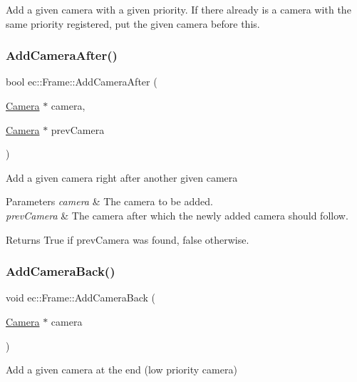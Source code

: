 Add a given camera with a given priority. If there already is a camera with the same priority registered, put the given camera before this. \mbox{\label{classec_1_1_frame_aa7cccffd1e0919e75faa35d1f38da5c1}} 
\subsubsection{\texorpdfstring{Add\+Camera\+After()}{AddCameraAfter()}}
{\footnotesize\ttfamily bool ec\+::\+Frame\+::\+Add\+Camera\+After (\begin{DoxyParamCaption}\item[{\mbox{\hyperlink{classec_1_1_camera}{Camera}} $\ast$}]{camera,  }\item[{\mbox{\hyperlink{classec_1_1_camera}{Camera}} $\ast$}]{prev\+Camera }\end{DoxyParamCaption})}

Add a given camera right after another given camera 
\begin{DoxyParams}{Parameters}
{\em camera} & The camera to be added. \\
\hline
{\em prev\+Camera} & The camera after which the newly added camera should follow. \\
\hline
\end{DoxyParams}
\begin{DoxyReturn}{Returns}
True if prev\+Camera was found, false otherwise. 
\end{DoxyReturn}
\mbox{\label{classec_1_1_frame_a06d07d0b719d2941c0334f4b54694348}} 
\subsubsection{\texorpdfstring{Add\+Camera\+Back()}{AddCameraBack()}}
{\footnotesize\ttfamily void ec\+::\+Frame\+::\+Add\+Camera\+Back (\begin{DoxyParamCaption}\item[{\mbox{\hyperlink{classec_1_1_camera}{Camera}} $\ast$}]{camera }\end{DoxyParamCaption})}

Add a given camera at the end (low priority camera) \mbox{\label{classec_1_1_frame_ae75241fcbc4c499a1ac3a1a084d546ae}} 
